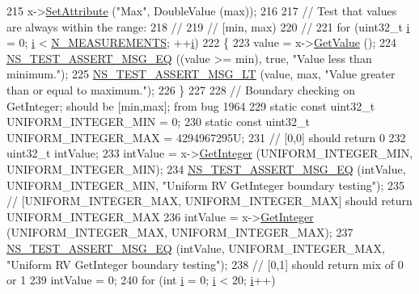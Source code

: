 \begin{DoxyCode}
215   x->\hyperlink{classns3_1_1ObjectBase_ac60245d3ea4123bbc9b1d391f1f6592f}{SetAttribute} (\textcolor{stringliteral}{"Max"}, DoubleValue (max));
216  
217   \textcolor{comment}{// Test that values are always within the range:}
218   \textcolor{comment}{//}
219   \textcolor{comment}{//     [min, max)}
220   \textcolor{comment}{//}
221   \textcolor{keywordflow}{for} (uint32\_t \hyperlink{bernuolliDistribution_8m_a6f6ccfcf58b31cb6412107d9d5281426}{i} = 0; \hyperlink{bernuolliDistribution_8m_a6f6ccfcf58b31cb6412107d9d5281426}{i} < \hyperlink{classRandomVariableStreamUniformTestCase_af698d1758a3c70dda2001f1b6d5b87b1}{N\_MEASUREMENTS}; ++\hyperlink{bernuolliDistribution_8m_a6f6ccfcf58b31cb6412107d9d5281426}{i})
222     \{
223       value = x->\hyperlink{classns3_1_1UniformRandomVariable_a03822d8c86ac51e9aa83bbc73041386b}{GetValue} ();
224       \hyperlink{group__testing_ga2a9d78cffb3db8e867c35fff0b698cf5}{NS\_TEST\_ASSERT\_MSG\_EQ} ((value >= min), \textcolor{keyword}{true}, \textcolor{stringliteral}{"Value less than minimum."});
225       \hyperlink{group__testing_ga1d96848b91407c9a0b36583e8b0ad7ae}{NS\_TEST\_ASSERT\_MSG\_LT} (value, max, \textcolor{stringliteral}{"Value greater than or equal to maximum."});
226     \}
227 
228   \textcolor{comment}{// Boundary checking on GetInteger; should be [min,max]; from bug 1964}
229   \textcolor{keyword}{static} \textcolor{keyword}{const} uint32\_t UNIFORM\_INTEGER\_MIN = 0;
230   \textcolor{keyword}{static} \textcolor{keyword}{const} uint32\_t UNIFORM\_INTEGER\_MAX = 4294967295U;
231   \textcolor{comment}{// [0,0] should return 0}
232   uint32\_t intValue;
233   intValue = x->\hyperlink{classns3_1_1RandomVariableStream_a66cd94e6305ce7f000f1a9ff0fcb9aef}{GetInteger} (UNIFORM\_INTEGER\_MIN, UNIFORM\_INTEGER\_MIN);
234   \hyperlink{group__testing_ga2a9d78cffb3db8e867c35fff0b698cf5}{NS\_TEST\_ASSERT\_MSG\_EQ} (intValue, UNIFORM\_INTEGER\_MIN, \textcolor{stringliteral}{"Uniform RV GetInteger
       boundary testing"});
235   \textcolor{comment}{// [UNIFORM\_INTEGER\_MAX, UNIFORM\_INTEGER\_MAX] should return UNIFORM\_INTEGER\_MAX}
236   intValue = x->\hyperlink{classns3_1_1RandomVariableStream_a66cd94e6305ce7f000f1a9ff0fcb9aef}{GetInteger} (UNIFORM\_INTEGER\_MAX, UNIFORM\_INTEGER\_MAX);
237   \hyperlink{group__testing_ga2a9d78cffb3db8e867c35fff0b698cf5}{NS\_TEST\_ASSERT\_MSG\_EQ} (intValue, UNIFORM\_INTEGER\_MAX, \textcolor{stringliteral}{"Uniform RV GetInteger
       boundary testing"});
238   \textcolor{comment}{// [0,1] should return mix of 0 or 1}
239   intValue = 0;
240   \textcolor{keywordflow}{for} (\textcolor{keywordtype}{int} \hyperlink{bernuolliDistribution_8m_a6f6ccfcf58b31cb6412107d9d5281426}{i} = 0; \hyperlink{bernuolliDistribution_8m_a6f6ccfcf58b31cb6412107d9d5281426}{i} < 20; \hyperlink{bernuolliDistribution_8m_a6f6ccfcf58b31cb6412107d9d5281426}{i}++)

\end{DoxyCode}
